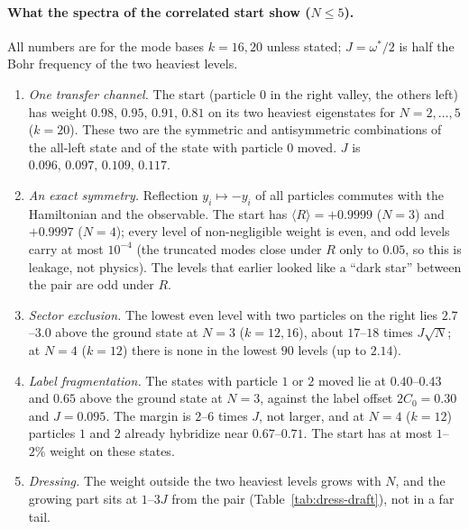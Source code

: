 \paragraph{What the spectra of the correlated start show ($N\le5$).}
All numbers are for the mode bases $k=16,20$ unless stated; $J=\omega^\ast/2$ is half the Bohr frequency of the two heaviest levels.
\begin{enumerate}[itemsep=0.2em]
\item \emph{One transfer channel.} The start (particle $0$ in the right valley, the others left) has weight $0.98,\,0.95,\,0.91,\,0.81$ on its two heaviest eigenstates for $N=2,\dots,5$ ($k=20$). These two are the symmetric and antisymmetric combinations of the all-left state and of the state with particle $0$ moved. $J$ is $0.096,\,0.097,\,0.109,\,0.117$.
\item \emph{An exact symmetry.} Reflection $y_i\mapsto-y_i$ of all particles commutes with the Hamiltonian and the observable. The start has $\langle R\rangle=+0.9999$ ($N=3$) and $+0.9997$ ($N=4$); every level of non-negligible weight is even, and odd levels carry at most $10^{-4}$ (the truncated modes close under $R$ only to $0.05$, so this is leakage, not physics). The levels that earlier looked like a ``dark star'' between the pair are odd under $R$.
\item \emph{Sector exclusion.} The lowest even level with two particles on the right lies $2.7$--$3.0$ above the ground state at $N=3$ ($k=12,16$), about $17$--$18$ times $J\sqrt N$; at $N=4$ ($k=12$) there is none in the lowest $90$ levels (up to $2.14$).
\item \emph{Label fragmentation.} The states with particle $1$ or $2$ moved lie at $0.40$--$0.43$ and $0.65$ above the ground state at $N=3$, against the label offset $2C_0=0.30$ and $J=0.095$. The margin is $2$--$6$ times $J$, not larger, and at $N=4$ ($k=12$) particles $1$ and $2$ already hybridize near $0.67$--$0.71$. The start has at most $1$--$2\%$ weight on these states.
\item \emph{Dressing.} The weight outside the two heaviest levels grows with $N$, and the growing part sits at $1$--$3J$ from the pair (Table~\ref{tab:dress-draft}), not in a far tail.
\end{enumerate}

